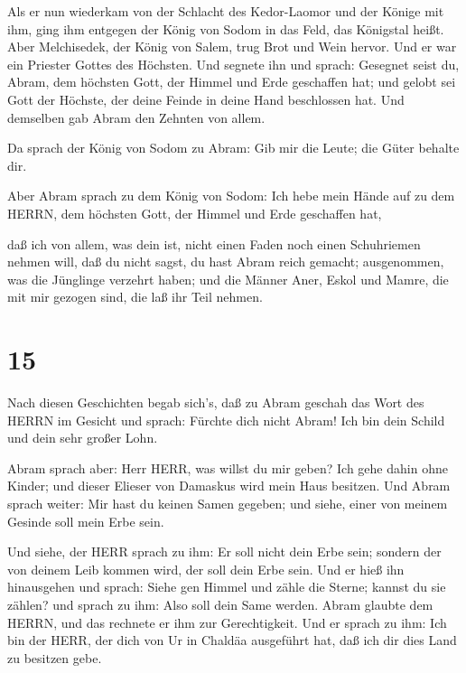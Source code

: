  Als er nun wiederkam von der Schlacht des Kedor-Laomor und
der Könige mit ihm, ging ihm entgegen der König von Sodom in das Feld,
das Königstal heißt.  Aber Melchisedek, der König von
Salem, trug Brot und Wein hervor. Und er war ein Priester Gottes des
Höchsten.  Und segnete ihn und sprach: Gesegnet seist du,
Abram, dem höchsten Gott, der Himmel und Erde geschaffen hat;
 und gelobt sei Gott der Höchste, der deine Feinde in deine
Hand beschlossen hat. Und demselben gab Abram den Zehnten von allem.

 Da sprach der König von Sodom zu Abram: Gib mir die Leute;
die Güter behalte dir.

 Aber Abram sprach zu dem König von Sodom: Ich hebe mein
Hände auf zu dem HERRN, dem höchsten Gott, der Himmel und Erde
geschaffen hat,

 daß ich von allem, was dein ist, nicht einen Faden noch
einen Schuhriemen nehmen will, daß du nicht sagst, du hast Abram reich
gemacht;  ausgenommen, was die Jünglinge verzehrt haben;
und die Männer Aner, Eskol und Mamre, die mit mir gezogen sind, die laß
ihr Teil nehmen.

\hypertarget{section-14}{%
\section{15}\label{section-14}}

 Nach diesen Geschichten begab sich's, daß zu Abram geschah
das Wort des HERRN im Gesicht und sprach: Fürchte dich nicht Abram! Ich
bin dein Schild und dein sehr großer Lohn.

 Abram sprach aber: Herr HERR, was willst du mir geben? Ich
gehe dahin ohne Kinder; und dieser Elieser von Damaskus wird mein Haus
besitzen.  Und Abram sprach weiter: Mir hast du keinen Samen
gegeben; und siehe, einer von meinem Gesinde soll mein Erbe sein.

 Und siehe, der HERR sprach zu ihm: Er soll nicht dein Erbe
sein; sondern der von deinem Leib kommen wird, der soll dein Erbe sein.
 Und er hieß ihn hinausgehen und sprach: Siehe gen Himmel
und zähle die Sterne; kannst du sie zählen? und sprach zu ihm: Also soll
dein Same werden.  Abram glaubte dem HERRN, und das rechnete
er ihm zur Gerechtigkeit.  Und er sprach zu ihm: Ich bin der
HERR, der dich von Ur in Chaldäa ausgeführt hat, daß ich dir dies Land
zu besitzen gebe.

